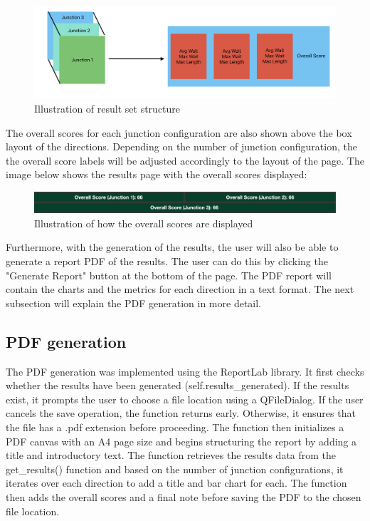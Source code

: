 \documentclass{article}
\begin{document}
    \begin{figure}[H]
        \centering
        \includegraphics[width=\textwidth]{results3d.png}
        \caption{Illustration of result set structure}
        \label{fig:results3d}
    \end{figure}

    The overall scores for each junction configuration are also shown above the box layout of the directions. Depending on the number of junction configuration, the
    the overall score labels will be adjusted accordingly to the layout of the page. The image below shows the results page with the overall scores displayed:

    \begin{figure}[H]
        \centering
        \includegraphics[width=\textwidth]{overallScores.png}
        \caption{Illustration of how the overall scores are displayed}
        \label{fig:overallScores}
    \end{figure}

    Furthermore, with the generation of the results, the user will also be able to generate a report PDF of the results. The user can do this by clicking the "Generate Report" button at the bottom of the page.
    The PDF report will contain the charts and the metrics for each direction in a text format. The next subsection will explain the PDF generation in more detail.

    \subsection{PDF generation}

    The PDF generation was implemented using the ReportLab library. It first checks whether the results have been generated (self.results\_generated). If the results exist, it prompts the user to choose a file
    location using a QFileDialog. If the user cancels the save operation, the function returns early. Otherwise, it ensures that the file has a .pdf extension before proceeding. The function then initializes a
    PDF canvas with an A4 page size and begins structuring the report by adding a title and introductory text. The function retrieves the results data from the get\_results() function and based on the number of junction
    configurations, it iterates over each direction to add a title and bar chart for each. The function then adds the overall scores and a final note before saving the PDF to the chosen file location.
\end{document}
